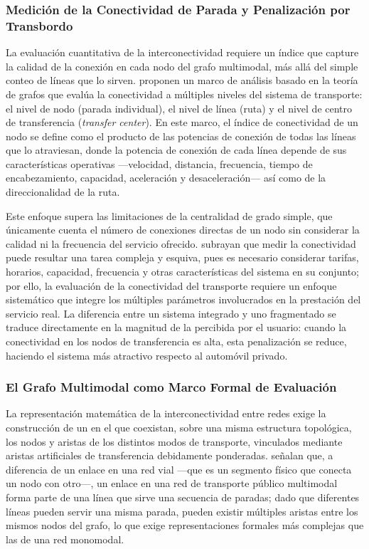 \subsubsection{Medición de la Conectividad de Parada y Penalización por Transbordo}
\label{subsubsec:penalizacion-transbordo}
 
La evaluación cuantitativa de la interconectividad requiere un índice que
capture la
calidad de la conexión en cada nodo del grafo multimodal, más allá del simple
conteo
de líneas que lo sirven. \citet{mishra2012} proponen un marco de análisis
basado
en la teoría de grafos que evalúa la conectividad a múltiples niveles del
sistema de
transporte: el nivel de nodo (parada individual), el nivel de línea (ruta) y el
nivel de
centro de transferencia (\textit{transfer center}). En este marco, el índice de
conectividad de un nodo se define como el producto de las potencias de conexión
de
todas las líneas que lo atraviesan, donde la potencia de conexión de cada línea
depende de sus características operativas ---velocidad, distancia, frecuencia,
tiempo
de encabezamiento, capacidad, aceleración y desaceleración--- así como de la
direccionalidad de la ruta.
 
Este enfoque supera las limitaciones de la centralidad de grado simple, que
únicamente cuenta el número de conexiones directas de un nodo sin considerar la
calidad ni la frecuencia del servicio ofrecido. \citet{mishra2012} subrayan
que
medir la conectividad puede resultar una tarea compleja y esquiva, pues es
necesario
considerar tarifas, horarios, capacidad, frecuencia y otras características del
sistema
en su conjunto; por ello, la evaluación de la conectividad del transporte
requiere un
enfoque sistemático que integre los múltiples parámetros involucrados en la
prestación del servicio real. La diferencia entre un sistema integrado y uno
fragmentado se traduce directamente en la magnitud de la
 percibida por el usuario: cuando la conectividad en los nodos de
transferencia es alta, esta penalización se reduce, haciendo el sistema más
atractivo
respecto al automóvil privado.
 
\subsubsection{El Grafo Multimodal como Marco Formal de Evaluación}
\label{subsubsec:grafo-multimodal}
 
La representación matemática de la interconectividad entre redes exige la
construcción de un  en el que coexistan, sobre una
misma
estructura topológica, los nodos y aristas de los distintos modos de transporte,
vinculados mediante aristas artificiales de transferencia debidamente
ponderadas.
\citet{mishra2012} señalan que, a diferencia de un enlace en una red vial
---que
es un segmento físico que conecta un nodo con otro---, un enlace en una red de
transporte público multimodal forma parte de una línea que sirve una secuencia
de
paradas; dado que diferentes líneas pueden servir una misma parada, pueden
existir
múltiples aristas entre los mismos nodos del grafo, lo que exige
representaciones
formales más complejas que las de una red monomodal.
 
